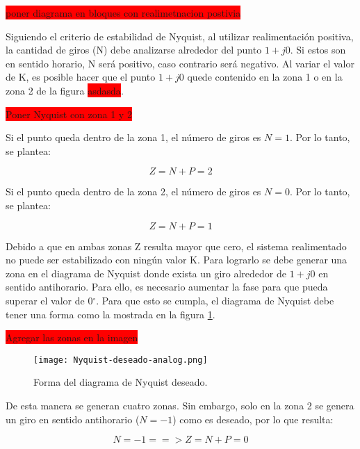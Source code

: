 \colorbox{red}{poner diagrama en bloques con realimetnacion postivia}

Siguiendo el criterio de estabilidad de Nyquist, al utilizar realimentación positiva, la cantidad de giros (N) debe analizarse alrededor del punto $1+j0$. Si estos son en sentido horario, N será positivo, caso contrario será negativo. Al variar el valor de K, es posible hacer que el punto $1+j0$ quede contenido en la zona 1 o en la zona 2 de la figura \colorbox{red}{asdasda}. 

\colorbox{red}{Poner Nyquist con zona 1 y 2}

Si el punto queda dentro de la zona 1, el número de giros es $N=1$. Por lo tanto, se plantea:

\begin{equation*}
	Z = N + P = 2
\end{equation*}


Si el punto queda dentro de la zona 2, el número de giros es $N=0$. Por lo tanto, se plantea:

\begin{equation*}
	Z = N + P = 1
\end{equation*}

Debido a que en ambas zonas Z resulta mayor que cero, el sistema realimentado no puede ser estabilizado con ningún valor K. Para lograrlo se debe generar una zona en el diagrama de Nyquist donde exista un giro alrededor de $1 + j0$ en sentido antihorario. Para ello, es necesario aumentar la fase para que pueda superar el valor de 0$\mathrm{{}^\circ}$.  Para que esto se cumpla, el diagrama de Nyquist debe tener una forma como la  mostrada en la figura \ref{fig:nyquist-deseado-analog}.

\colorbox{red}{Agregar las zonas en la imagen}

\begin{figure}[H]
	\centering
	\texttt{[image: Nyquist-deseado-analog.png]}
	\caption{Forma del diagrama de Nyquist deseado.}
	\label{fig:nyquist-deseado-analog}
\end{figure}

De esta manera se generan cuatro zonas. Sin embargo, solo en la zona 2 se genera un giro en sentido antihorario ($N=-1$) como es deseado, por lo que resulta:

\begin{equation*}
	N = -1 ==> Z = N + P = 0
\end{equation*}


